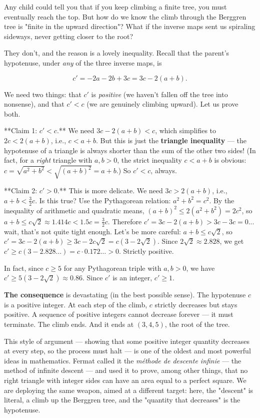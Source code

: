 Any child could tell you that if you keep climbing a finite tree, you must eventually reach the top. But how do we know the climb through the Berggren tree is "finite in the upward direction"? What if the inverse maps sent us spiraling sideways, never getting closer to the root?

They don't, and the reason is a lovely inequality. Recall that the parent's hypotenuse, under \textit{any} of the three inverse maps, is

\[
c' = -2a - 2b + 3c = 3c - 2(a + b).
\]

We need two things: that $c'$ is \textit{positive} (we haven't fallen off the tree into nonsense), and that $c' < c$ (we are genuinely climbing upward). Let us prove both.

**Claim 1: $c' < c$.** We need $3c - 2(a+b) < c$, which simplifies to $2c < 2(a+b)$, i.e., $c < a + b$. But this is just the \textbf{triangle inequality} --- the hypotenuse of a triangle is always shorter than the sum of the other two sides! (In fact, for a \textit{right} triangle with $a, b > 0$, the strict inequality $c < a + b$ is obvious: $c = \sqrt{a^2 + b^2} < \sqrt{(a+b)^2} = a + b$.) So $c' < c$, always.

**Claim 2: $c' > 0$.** This is more delicate. We need $3c > 2(a+b)$, i.e., $a + b < \frac{3}{2}c$. Is this true? Use the Pythagorean relation: $a^2 + b^2 = c^2$. By the inequality of arithmetic and quadratic means, $(a + b)^2 \leq 2(a^2 + b^2) = 2c^2$, so $a + b \leq c\sqrt{2} \approx 1.414c < 1.5c = \frac{3}{2}c$. Therefore $c' = 3c - 2(a+b) > 3c - 3c = 0$... wait, that's not quite tight enough. Let's be more careful: $a + b \leq c\sqrt{2}$, so $c' = 3c - 2(a+b) \geq 3c - 2c\sqrt{2} = c(3 - 2\sqrt{2})$. Since $2\sqrt{2} \approx 2.828$, we get $c' \geq c(3 - 2.828\ldots) = c \cdot 0.172\ldots > 0$. Strictly positive.

In fact, since $c \geq 5$ for any Pythagorean triple with $a, b > 0$, we have $c' \geq 5(3 - 2\sqrt{2}) \approx 0.86$. Since $c'$ is an integer, $c' \geq 1$.

\textbf{The consequence} is devastating (in the best possible sense). The hypotenuse $c$ is a positive integer. At each step of the climb, $c$ strictly decreases but stays positive. A sequence of positive integers cannot decrease forever --- it must terminate. The climb ends. And it ends at $(3, 4, 5)$, the root of the tree.

This style of argument --- showing that some positive integer quantity decreases at every step, so the process must halt --- is one of the oldest and most powerful ideas in mathematics. Fermat called it the \textit{m\'ethode de descente infinie} --- the method of infinite descent --- and used it to prove, among other things, that no right triangle with integer sides can have an area equal to a perfect square. We are deploying the same weapon, aimed at a different target: here, the "descent" is literal, a climb up the Berggren tree, and the "quantity that decreases" is the hypotenuse.

